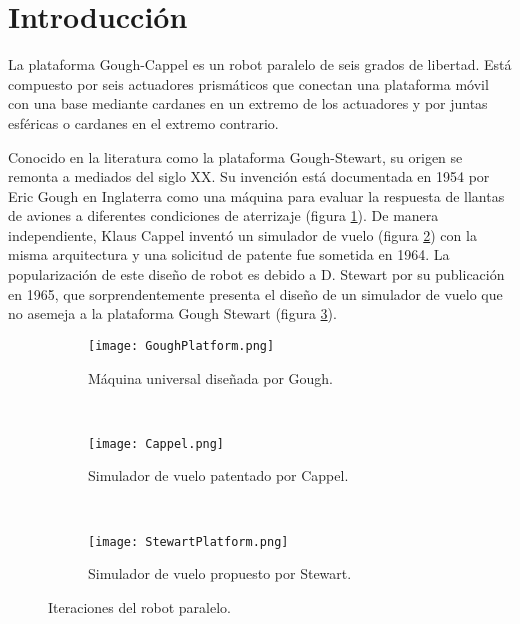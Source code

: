 \section{Introducción}

La plataforma Gough-Cappel es un robot paralelo de seis grados de libertad.
Está compuesto por seis actuadores prismáticos que conectan una plataforma
móvil con una base mediante cardanes en un extremo de los actuadores y por
juntas esféricas o cardanes en el extremo contrario. 

Conocido en la literatura como la 
plataforma Gough-Stewart, su origen se remonta a mediados del siglo XX.
Su invención está documentada en 1954 por Eric Gough 
\cite{gough} en Inglaterra como una máquina para 
evaluar la respuesta de llantas de aviones a diferentes 
condiciones de aterrizaje (figura \ref{fig: gough robot}). 
De manera independiente, Klaus Cappel inventó un simulador de vuelo (figura \ref{fig: cappel robot})
con la misma arquitectura y una solicitud de patente 
fue sometida en 1964.
La popularización de este diseño de robot es debido a D. Stewart 
por su publicación en 1965, que sorprendentemente presenta el
diseño de un simulador de vuelo que no asemeja a la 
plataforma Gough Stewart (figura \ref{fig: stewart robot}).



\begin{figure}[htb!]
    \centering
    \begin{subfigure}[b]{0.3\textwidth}
        \texttt{[image: GoughPlatform.png]}
        \caption{Máquina universal diseñada por Gough. \cite{stewart}}
        \label{fig: gough robot}
    \end{subfigure}
    ~ %
    \begin{subfigure}[b]{0.3\textwidth}
         \texttt{[image: Cappel.png]}
        \caption{Simulador de vuelo patentado por Cappel. \cite{cappel}}
        \label{fig: cappel robot}
    \end{subfigure}
    ~ %
    \begin{subfigure}[b]{0.3\textwidth}
        \texttt{[image: StewartPlatform.png]}
        \caption{Simulador de vuelo propuesto por Stewart. \cite{stewart}}
        \label{fig: stewart robot}
    \end{subfigure}
    \caption{Iteraciones del robot paralelo.}\label{fig: parallel robots}
\end{figure}

